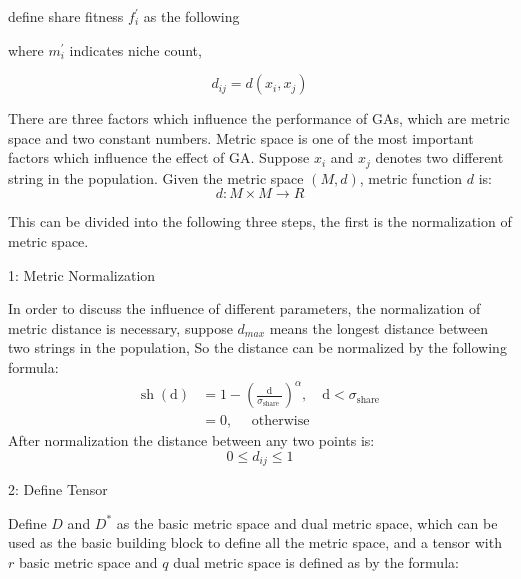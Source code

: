 \documentclass[smallextended]{svjour3}       %
\begin{document}
\begin{multicols}{2}
define share fitness $f_i^{\prime}$ as the following


where $m_i^{\prime}$ indicates niche count,





\begin{equation}
d_{ij} = d(x_i,x_j)
\end{equation}

There are three factors which influence the performance of GAs, which are metric space and two constant numbers.
Metric space is one of the most important factors which influence the effect of GA. 
Suppose $x_i$ and $x_j$ denotes two different string in the population. Given the metric space $(M,d)$,
metric function $d$ is:
\begin{equation}
d: M\times M \rightarrow R
\end{equation}

This can be divided into the following three steps, the first is the normalization of metric space.

1: Metric Normalization

In order to discuss the influence of different parameters, the normalization of metric distance is 
necessary, suppose $d_{max}$ means the longest distance between two strings in the population, So the 
distance can be normalized by the following formula:
\begin{equation}
\begin{aligned} 
\operatorname{sh}(\mathrm{d}) & = 1 - \left(\frac{\mathrm{d}}{\sigma_{\text {share }}}\right)^{\alpha}, 
                                  \quad \mathrm{d}<\sigma_{\text {share }} \\ 
                              & = 0, \quad \text { otherwise }
\end{aligned}
\end{equation}
After normalization the distance between any two points is:
\begin{equation}
    0 \leq d_{ij}\leq 1 
\end{equation}


2: Define Tensor

Define $D$ and $D^{\ast}$ as the basic metric space and dual metric space, which can be used as the 
basic building block to define all the metric space, and a tensor with $r$ basic metric space and
$q$ dual metric space is defined as by the formula:


\end{multicols}
\end{document}
